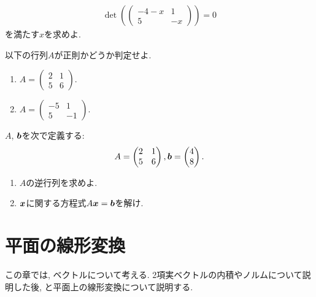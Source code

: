 \begin{quiz}
  \label{quiz:2:2}
  
  \begin{align*}
    \det(
    \begin{pmatrix}
      -4-x&1\\5&-x
    \end{pmatrix})=0
  \end{align*}
  を満たす$x$を求めよ.
\end{quiz}


\begin{quiz}
  \label{quiz:2:reg:1}
  以下の行列$A$が正則かどうか判定せよ.
  \begin{enumerate}
  \item
    $A=\begin{pmatrix}2&1\\5&6\end{pmatrix}$.
  \item
    $A=\begin{pmatrix}-5&1\\5&-1\end{pmatrix}$.
  \end{enumerate}
\end{quiz}

\begin{quiz}
  \label{quiz:2:4}
  $A$, $\boldsymbol{b}$を次で定義する:
  \begin{align*}
    A=\begin{pmatrix}
      2&1\\5&6
    \end{pmatrix},
    \boldsymbol{b}=\begin{pmatrix}
      4\\8
    \end{pmatrix}.   
  \end{align*}
  \begin{enumerate}
  \item $A$の逆行列を求めよ.
  \item $\boldsymbol{x}$に関する方程式$A\boldsymbol{x}=\boldsymbol{b}$を解け.
  \end{enumerate}
\end{quiz}




\chapter{平面の線形変換}
\label{chap:lintrans}
この章では,
ベクトルについて考える.
2項実ベクトルの内積やノルムについて説明した後,
と平面上の線形変換について説明する.

